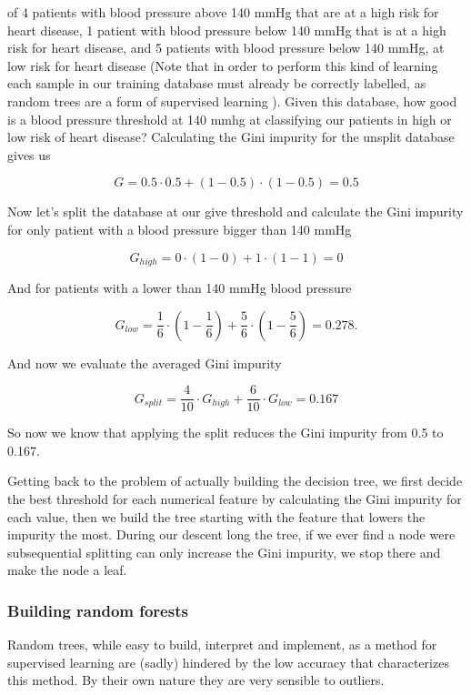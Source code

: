 \documentclass[a4paper]{report}
\begin{document}
of 4 patients with blood pressure above 140 mmHg that are at a high risk for heart disease, 1 patient with blood pressure below 140 mmHg that is at a high risk for heart disease, and 5 patients with blood pressure below 140 mmHg, at low risk for heart disease (Note that in order to perform this kind of learning each sample in our training database must already be correctly labelled, as random trees are a form of supervised learning ).
Given this database, how good is a blood pressure threshold at 140 mmhg at classifying our patients in high or low risk of heart disease?
Calculating the Gini impurity for the unsplit database gives us

\begin{equation}
    G = 0.5 \cdot 0.5 + (1-0.5) \cdot (1-0.5) = 0.5
\end{equation}

Now let's split the database at our give threshold and calculate the Gini impurity for only patient with a blood pressure bigger than 140 mmHg

\begin{equation}
    G_{high} = 0 \cdot (1 -0) + 1 \cdot (1-1) = 0
\end{equation}

And for patients with a lower than 140 mmHg blood pressure

\begin{equation}
    G_{low} = \frac{1}{6} \cdot (1 - \frac{1}{6}) + \frac{5}{6} \cdot (1- \frac{5}{6}) = 0.278.
\end{equation}

And now we evaluate the averaged Gini impurity

\begin{equation}
    G_{split} = \frac{4}{10} \cdot G_{high} + \frac{6}{10} \cdot G_{low} = 0.167
\end{equation}

So now we know that applying the split reduces the Gini impurity from 0.5 to 0.167.

Getting back to the problem of actually building the decision tree, we first decide the best threshold for each numerical feature by calculating the Gini impurity for each value, then we build the tree starting with the feature that lowers the impurity the most.
During our descent long the tree, if we ever find a node were subsequential splitting can only increase the Gini impurity, we stop there and make the node a leaf.

\subsubsection{Building random forests}
Random trees, while easy to build, interpret and implement, as a method for supervised learning are (sadly) hindered by the low accuracy that characterizes this method.
By their own nature they are very sensible to outliers.
\end{document}
